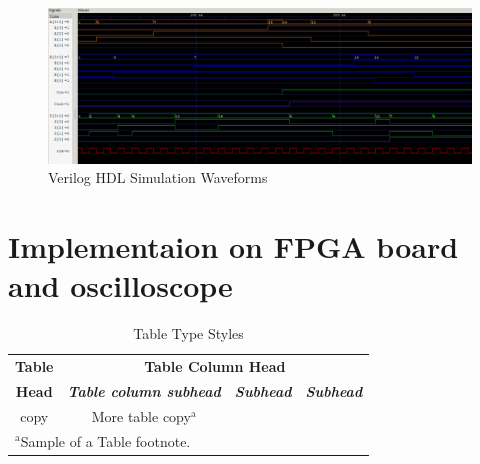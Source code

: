 \documentclass[conference]{IEEEtran}
\begin{document}
\begin{figure}[h]
    \centering
    \includegraphics[width=1\linewidth]{veriloggtk.png}
    \caption{Verilog HDL Simulation Waveforms}
    \label{fig:verilog_waveform}
\end{figure}

\section{Implementaion on FPGA board and oscilloscope}





\begin{table}[htbp]
\caption{Table Type Styles}
\begin{center}
\begin{tabular}{|c|c|c|c|}
\hline
\textbf{Table}&\multicolumn{3}{|c|}{\textbf{Table Column Head}} \\
\cline{2-4} 
\textbf{Head} & \textbf{\textit{Table column subhead}}& \textbf{\textit{Subhead}}& \textbf{\textit{Subhead}} \\
\hline
copy& More table copy$^{\mathrm{a}}$& &  \\
\hline
\multicolumn{4}{l}{$^{\mathrm{a}}$Sample of a Table footnote.}
\end{tabular}
\label{tab1}
\end{center}
\end{table}
\end{document}
